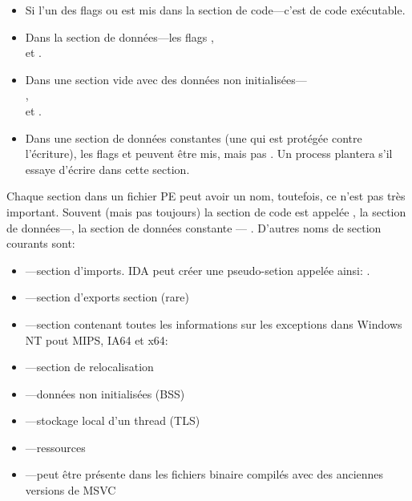 \begin{itemize}
\item Si l'un des flags  ou 
est mis dans la section de code---c'est de code exécutable.

\item Dans la section de données---les flags ,\\
 et .

\item Dans une section vide avec des données non initialisées---\\
,  \\
et .

\item Dans une section de données constantes (une qui est protégée contre l'écriture),
les flags  et  peuvent
être mis, mais pas .
Un process plantera s'il essaye d'écrire dans cette section.
\end{itemize}

Chaque section dans un fichier PE peut avoir un nom, toutefois, ce n'est pas très
important.
Souvent (mais pas toujours) la section de code est appelée , la section
de données---, la section de données constante ---  .
D'autres noms de section courants sont:

\begin{itemize}
\item {}---section d'imports.
\ac{IDA} peut créer une pseudo-setion appelée ainsi: .
\item {}---section d'exports section (rare)
\item {}---section contenant toutes les informations sur les exceptions
dans Windows NT pout MIPS, \ac{IA64} et x64: 
\item {}---section de relocalisation
\item {}---données non initialisées (\ac{BSS})
\item {}---stockage local d'un thread (\ac{TLS})
\item {}---ressources
\item {}---peut être présente dans les fichiers binaire compilés avec des
anciennes versions de MSVC
\end{itemize}

